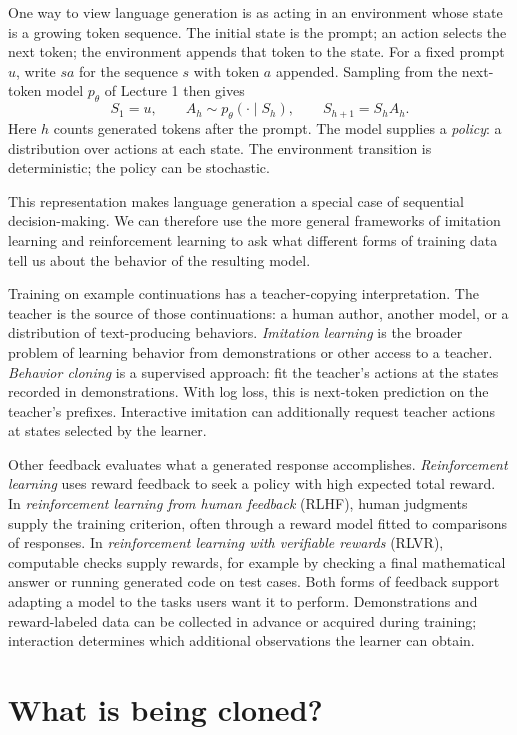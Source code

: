\documentclass[11pt,twoside]{article}
\theoremstyle{definition}
\theoremstyle{remark}
\begin{document}
One way to view language generation is as acting in an environment whose
state is a growing token sequence. The initial state is the prompt; an
action selects the next token; the environment appends that token to the
state. For a fixed prompt $u$, write $sa$ for the sequence $s$ with token
$a$ appended. Sampling from the next-token model $p_\theta$ of Lecture 1
then gives
\[
 S_1=u,\qquad A_h\sim p_\theta(\cdot\mid S_h),\qquad
 S_{h+1}=S_hA_h.
\]
Here $h$ counts generated tokens after the prompt. The model supplies a
\emph{policy}: a distribution over actions at each state. The environment
transition is deterministic; the policy can be stochastic.

This representation makes language generation a special case of sequential
decision-making. We can therefore use the more general frameworks of
imitation learning and reinforcement learning to ask what different forms
of training data tell us about the behavior of the resulting model.

Training on example continuations has a teacher-copying interpretation.
The teacher is the source of those continuations: a human author, another
model, or a distribution of text-producing behaviors.
\emph{Imitation learning} is the broader problem of learning behavior from
demonstrations or other access to a teacher. \emph{Behavior cloning} is a
supervised approach: fit the teacher's actions at the states recorded in
demonstrations. With log loss, this is next-token prediction on the
teacher's prefixes. Interactive imitation can additionally request teacher
actions at states selected by the learner.

Other feedback evaluates what a generated response accomplishes.
\emph{Reinforcement learning} uses reward feedback to seek a policy with
high expected total reward. In \emph{reinforcement learning from human
feedback} (RLHF), human judgments supply the training criterion, often
through a reward model fitted to comparisons of responses. In
\emph{reinforcement learning with verifiable rewards} (RLVR), computable
checks supply rewards, for example by checking a final mathematical answer
or running generated code on test cases. Both forms of feedback support
adapting a model to the tasks users want it to perform. Demonstrations and
reward-labeled data can be collected in advance or acquired during training;
interaction determines which additional observations the learner can obtain.

\section{What is being cloned?}
\label{sec:setup}
\end{document}
